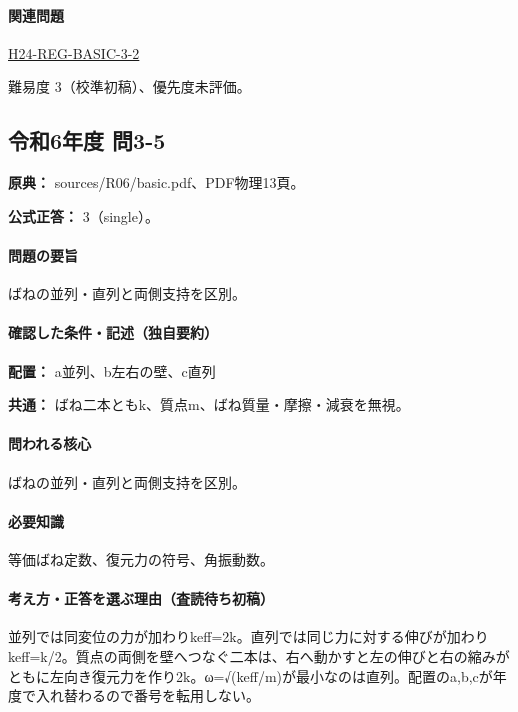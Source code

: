 \paragraph{関連問題} \hyperref[q:h24-reg-basic-3-2]{H24-REG-BASIC-3-2}

\par 難易度 3（校準初稿）、優先度未評価。

\subsection{令和6年度 問3-5}
\label{q:r06-reg-basic-3-5}

\noindent\textbf{原典：} sources/R06/basic.pdf、PDF物理13頁。

\textbf{公式正答：} 3（single）。

\paragraph{問題の要旨} ばねの並列・直列と両側支持を区別。

\paragraph{確認した条件・記述（独自要約）}\mbox{}\par

\noindent\textbf{配置：} a並列、b左右の壁、c直列\par

\noindent\textbf{共通：} ばね二本ともk、質点m、ばね質量・摩擦・減衰を無視。\par

\paragraph{問われる核心} ばねの並列・直列と両側支持を区別。

\paragraph{必要知識} 等価ばね定数、復元力の符号、角振動数。

\paragraph{考え方・正答を選ぶ理由（査読待ち初稿）} 並列では同変位の力が加わりkeff=\allowbreak{}2k。直列では同じ力に対する伸びが加わりkeff=\allowbreak{}k/2。質点の両側を壁へつなぐ二本は、右へ動かすと左の伸びと右の縮みがともに左向き復元力を作り2k。ω=√(keff/m)が最小なのは直列。配置のa,b,cが年度で入れ替わるので番号を転用しない。

